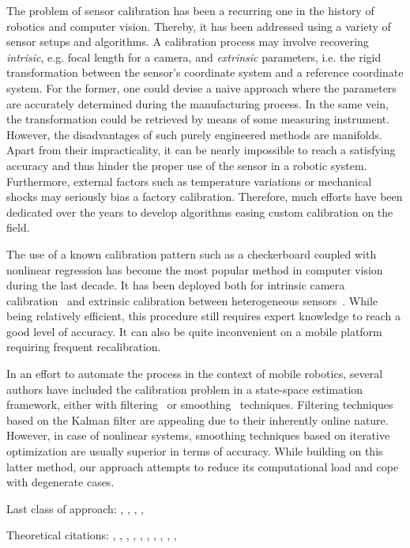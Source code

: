 The problem of sensor calibration has been a recurring one in the history of
robotics and computer vision. Thereby, it has been addressed using a
variety of sensor setups and algorithms. A calibration process may involve
recovering \emph{intrisic}, e.g. focal length for a camera, and \emph{extrinsic}
parameters, i.e. the rigid transformation between the sensor's coordinate system
and a reference coordinate system. For the former, one could devise a naive
approach where the parameters are accurately determined during the manufacturing
process. In the same vein, the transformation could be retrieved by means of
some measuring instrument. However, the disadvantages of such purely
engineered methods are manifolds. Apart from their impracticality, it can be
nearly impossible to reach a satisfying accuracy and thus hinder the proper use
of the sensor in a robotic system. Furthermore, external factors such as
temperature variations or mechanical shocks may seriously bias a factory
calibration. Therefore, much efforts have been dedicated over the years to
develop algorithms easing custom calibration on the field.

The use of a known calibration pattern such as a checkerboard coupled with
nonlinear regression has become the most popular method in computer vision
during the last decade. It has been deployed both for intrinsic camera
calibration~\cite{sturm99plane} and extrinsic calibration
between heterogeneous sensors~\cite{zhang04extrinsic}. While being relatively
efficient, this procedure still requires expert knowledge to reach a good level
of accuracy. It can also be quite inconvenient on a mobile platform requiring
frequent recalibration.

In an effort to automate the process in the context of mobile robotics, several
authors have included the calibration problem in a state-space estimation
framework, either with filtering~\cite{martinelli06automatic} or
smoothing~\cite{kuemmerle11simultaneous} techniques. Filtering techniques based
on the Kalman filter are appealing due to their inherently online nature.
However, in case of nonlinear systems, smoothing techniques based on iterative
optimization are usually superior in terms of accuracy. While building on this
latter method, our approach attempts to reduce its computational load and cope
with degenerate cases.



Last class of approach: \cite{brookshire12extrinsic}, \cite{gao10online},
\cite{sheehan12self}, \cite{levinson10unsupervised},

Theoretical citations: \cite{davis11algorithm}, \cite{aster11parameter},
\cite{chan94lowrank}, \cite{finsterle11truncated}, \cite{golub96matrix},
\cite{hansen87truncated}, \cite{hong92rank}, \cite{jauffret07observability},
\cite{kitagawa01regularization},
\cite{mackay05information}, 
 \cite{kaess09covariance}
